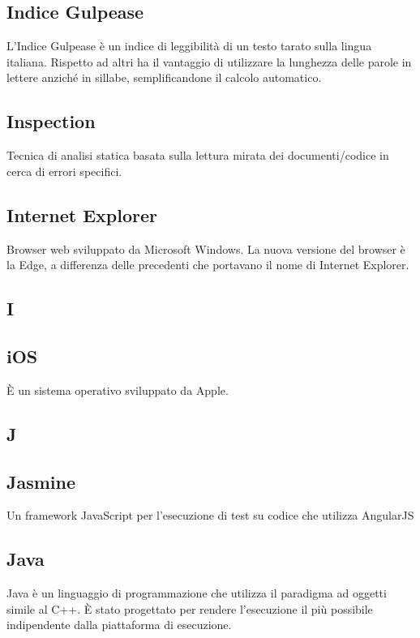\subsection{Indice Gulpease}
L'Indice Gulpease è un indice di leggibilità di un testo tarato sulla lingua
italiana. Rispetto ad altri ha il vantaggio di utilizzare la lunghezza delle parole in lettere
anziché in sillabe, semplificandone il calcolo automatico.

\subsection{Inspection }
Tecnica di analisi statica basata sulla lettura mirata dei documenti/codice in cerca di
errori specifici.

\subsection{Internet Explorer}
Browser web sviluppato da Microsoft Windows. La nuova versione del browser è la Edge, a differenza delle precedenti che portavano il nome di Internet Explorer.

\newpage

\begin{center}
\Huge\section{\uppercase{i}}
\end{center}

\subsection{iOS}
È un sistema operativo sviluppato da Apple.

\newpage

\begin{center}
\Huge\section{\uppercase{J}}
\end{center}

\subsection{Jasmine}
Un framework JavaScript per l'esecuzione di test su codice che utilizza AngularJS

\subsection{Java}
Java è un linguaggio di programmazione che utilizza il paradigma ad oggetti simile al C++. È stato
progettato per rendere l'esecuzione il più possibile indipendente dalla piattaforma di
esecuzione.

